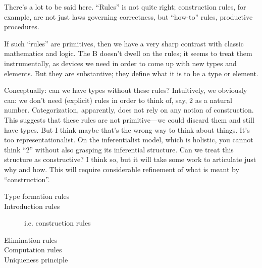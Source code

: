 \begin{ednote}
  There's a lot to be said here.  ``Rules'' is not quite right;
  construction rules, for example, are not just laws governing
  correctness, but ``how-to'' rules, productive procedures.

  If such ``rules'' are primitives, then we have a very sharp contrast
  with classic mathematics and logic.  The \HoTT{}B{} doesn't dwell on
  the rules; it seems to treat them instrumentally, as devices we need
  in order to come up with new types and elements.  But they are
  substantive; they define what it is to be a type or element.

  Conceptually: can we have types without these rules?  Intuitively,
  we obviously can: we don't need (explicit) rules in order to think
  of, say, $2$ as a natural number.  Categorization, apparently, does
  not rely on any notion of construction.  This suggests that these
  rules are not primitive---we could discard them and still have
  types.  But I think maybe that's the wrong way to think about
  things.  It's too representationalist.  On the inferentialist model,
  which is holistic, you cannot think ``$2$'' without also grasping
  its inferential structure.  Can we treat this structure as
  constructive?  I think so, but it will take some work to articulate
  just why and how.  This will require considerable refinement of what
  is meant by ``construction''.
\end{ednote}

\begin{description}
\item [Type formation rules]
\item [Introduction rules] i.e. construction rules
\item [Elimination rules]
\item [Computation rules]
\item [Uniqueness principle]
\end{description}

